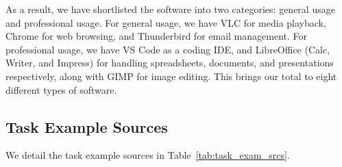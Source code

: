 As a result, we have shortlisted the software into two categories: general usage and professional usage. 
For general usage, we have VLC for media playback, Chrome for web browsing, and Thunderbird for email management.
For professional usage, we have VS Code as a coding IDE, and LibreOffice (Calc, Writer, and Impress) for handling spreadsheets, documents, and presentations respectively, along with GIMP for image editing. 
This brings our total to eight different types of software.

\subsection{Task Example Sources}
\label{sub:task_exam_srcs}

We detail the task example sources in Table~\ref{tab:task_exam_srcs}.

